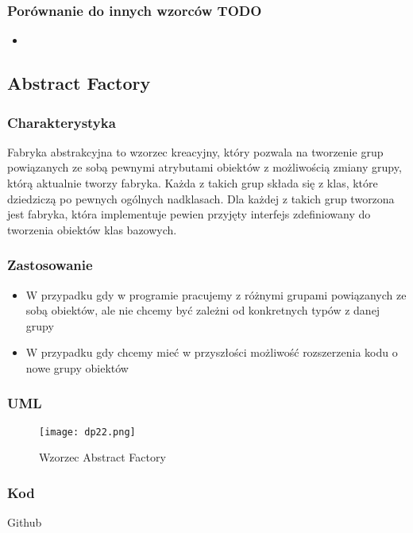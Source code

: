 \documentclass[a4paper,15pt]{article}
\begin{document}
\subsubsection{Porównanie do innych wzorców TODO}
\begin{itemize}
\item
\end{itemize}

\newpage
\subsection{Abstract Factory}
\subsubsection{Charakterystyka}
Fabryka abstrakcyjna to wzorzec kreacyjny, który pozwala na tworzenie grup powiązanych ze sobą pewnymi atrybutami obiektów z możliwością zmiany grupy, którą aktualnie tworzy fabryka. Każda z takich grup składa się z klas, które dziedziczą po pewnych ogólnych nadklasach. Dla każdej z takich grup tworzona jest fabryka, która implementuje pewien przyjęty interfejs zdefiniowany do tworzenia obiektów klas bazowych. 


\subsubsection{Zastosowanie}
\begin{itemize}
\item W przypadku gdy w programie pracujemy z różnymi grupami powiązanych ze sobą obiektów, ale nie chcemy być zależni od konkretnych typów z danej grupy
\item W przypadku gdy chcemy mieć w przyszłości możliwość rozszerzenia kodu o nowe grupy obiektów 
\end{itemize}

\subsubsection{UML}

\begin{figure}[H]
\centering
  \texttt{[image: dp22.png]}
  \caption{Wzorzec Abstract Factory}
\end{figure}

\subsubsection{Kod}
Github
\end{document}
